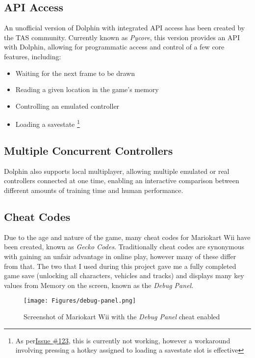 \subsection{API Access}
An unofficial version of Dolphin with integrated API access has been created by the TAS community. Currently known as \textit{Pycore}\cite{DolphinWithScriptingSupport}, this version provides an API with Dolphin, allowing for programmatic access and control of a few core features, including:
\begin{itemize}
    \item Waiting for the next frame to be drawn
    \item Reading a given location in the game's memory
    \item Controlling an emulated controller
    \item Loading a savestate \footnote{As per\href{https://github.com/TASLabz/dolphin/issues/123}{Issue \#123}, this is currently not working, however a workaround involving pressing a hotkey assigned to loading a savestate slot is effective}
\end{itemize}

\subsection{Multiple Concurrent Controllers}
Dolphin also supports local multiplayer, allowing multiple emulated or real controllers connected at one time, enabling an interactive comparison between different amounts of training time and human performance.
\subsection{Cheat Codes}
Due to the age and nature of the game, many cheat codes for Mariokart Wii have been created, known as \textit{Gecko Codes}\cite{GeckoCode}. Traditionally cheat codes are synonymous with gaining an unfair advantage in online play, however many of these differ from that. The two that I used during this project gave me a fully completed game save (unlocking all characters, vehicles and tracks) and displays many key values from Memory on the screen, known as the \textit{Debug Panel}.
\begin{figure}[hbt]
    \centering
    \texttt{[image: Figures/debug-panel.png]}
    \caption{Screenshot of Mariokart Wii with the \textit{Debug Panel} cheat enabled}
    \label{fig:gecko-code}
\end{figure}
